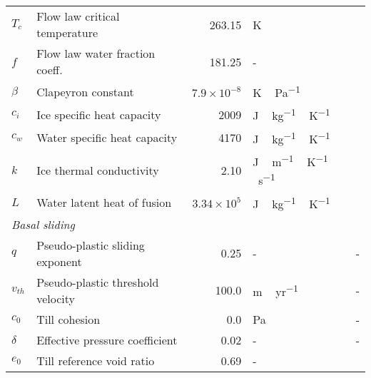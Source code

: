 \documentclass[tc, manuscript]{copernicus}
\begin{document}
\begin{table*}
{\begin{tabular}{llrll}
    $T_c$   & Flow law critical temperature
            & 263.15
            & \unit{K}
            & \citet{Paterson.Budd.1982} \\

    $f$     & Flow law water fraction coeff.
            & 181.25
            & -
            & \citet{Lliboutry.Duval.1985} \\

    $\beta$ & Clapeyron constant
            & $7.9\times10^{-8}$
            & \unit{K\,Pa^{-1}}
            & \citet{Luthi.etal.2002} \\

    $c_i$   & Ice specific heat capacity
            & 2009
            & \unit{J\,kg^{-1}\,K^{-1}}
            & \citet{Aschwanden.etal.2012} \\

    $c_w$   & Water specific heat capacity
            & 4170
            & \unit{J\,kg^{-1}\,K^{-1}}
            & \citet{Aschwanden.etal.2012} \\

    $k$     & Ice thermal conductivity
            & 2.10
            & \unit{J\,m^{-1}\,K^{-1}\,s^{-1}}
            & \citet{Aschwanden.etal.2012} \\

    $L$     & Water latent heat of fusion
            & $3.34\times10^5$
            & \unit{J\,kg^{-1}\,K^{-1}}
            & \citet{Aschwanden.etal.2012} \\

    \multicolumn{2}{l}{\emph{Basal sliding}} \\

    $q$     & Pseudo-plastic sliding exponent
            & 0.25
            & -
            & - \\

    $v_{th}$& Pseudo-plastic threshold velocity
            & 100.0
            & \unit{m\,yr^{-1}}
            & - \\

    $c_0$   & Till cohesion
            & 0.0
            & Pa
            & - \\

    $\delta$& Effective pressure coefficient
            & 0.02
            & -
            & - \\

    $e_0$   & Till reference void ratio
            & 0.69
            & -
            & \citet{Tulaczyk.etal.2000} \\


\end{tabular}}
\end{table*}
\end{document}

